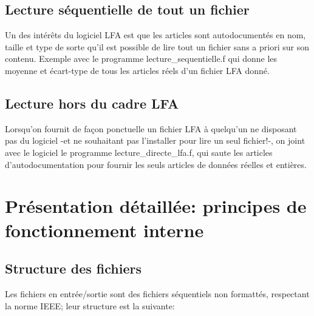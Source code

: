 \documentclass[10pt,french]{book}
\begin{document}
\section{Lecture séquentielle de tout un fichier}

\p Un des intérêts du logiciel LFA est que les articles sont autodocumentés
en nom, taille et type de sorte qu'il est possible de lire
tout un fichier sans a priori sur son contenu. Exemple avec le programme
lecture\_sequentielle.f
qui donne les moyenne et écart-type de tous les articles réels 
d'un fichier LFA donné.


\section{Lecture hors du cadre LFA}

\p Lorsqu'on fournit de façon ponctuelle un fichier LFA
à quelqu'un ne disposant pas du logiciel -et ne souhaitant
pas l'installer pour lire un seul fichier!-, on joint
avec le logiciel le programme lecture\_directe\_lfa.f,
qui saute les articles
d'autodocumentation pour fournir les seuls
articles de données réelles et entières.

\chapter{Présentation détaillée: principes de fonctionnement interne}

\section{Structure des fichiers}

\p Les fichiers en entrée/sortie sont des fichiers séquentiels 
non formattés, respectant la norme IEEE; leur structure est la suivante:
\end{document}
